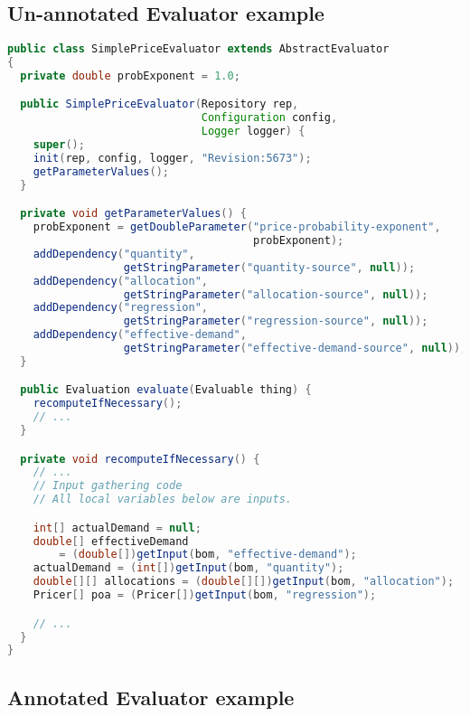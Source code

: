 \documentclass{article}
\begin{document}
\subsection{Un-annotated Evaluator example}
\label{sec:unannotatedeval}

{\small
\begin{lstlisting}[language={Java}]
public class SimplePriceEvaluator extends AbstractEvaluator
{
  private double probExponent = 1.0;

  public SimplePriceEvaluator(Repository rep,
                              Configuration config,
                              Logger logger) {
    super();
    init(rep, config, logger, "Revision:5673");
    getParameterValues();
  }

  private void getParameterValues() {
    probExponent = getDoubleParameter("price-probability-exponent",
                                      probExponent);
    addDependency("quantity",
                  getStringParameter("quantity-source", null));
    addDependency("allocation",
                  getStringParameter("allocation-source", null));
    addDependency("regression",
                  getStringParameter("regression-source", null));
    addDependency("effective-demand",
                  getStringParameter("effective-demand-source", null));
  }

  public Evaluation evaluate(Evaluable thing) {
    recomputeIfNecessary();
    // ...
  }

  private void recomputeIfNecessary() {
    // ...
    // Input gathering code
    // All local variables below are inputs.

    int[] actualDemand = null;
    double[] effectiveDemand
        = (double[])getInput(bom, "effective-demand");
    actualDemand = (int[])getInput(bom, "quantity");
    double[][] allocations = (double[][])getInput(bom, "allocation");
    Pricer[] poa = (Pricer[])getInput(bom, "regression");

    // ...
  }
}
\end{lstlisting}
}

\clearpage
\subsection{Annotated Evaluator example}
\label{sec:annotatedeval}
\end{document}
